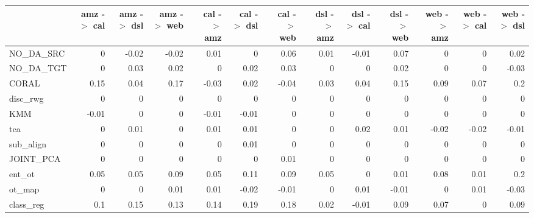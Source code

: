 \begin{tabular}{lrrrrrrrrrrrr}
\hline
           &   amz -\ensuremath{>} cal &   amz -\ensuremath{>} dsl &   amz -\ensuremath{>} web &   cal -\ensuremath{>} amz &   cal -\ensuremath{>} dsl &   cal -\ensuremath{>} web &   dsl -\ensuremath{>} amz &   dsl -\ensuremath{>} cal &   dsl -\ensuremath{>} web &   web -\ensuremath{>} amz &   web -\ensuremath{>} cal &   web -\ensuremath{>} dsl \\
\hline
 NO\_DA\_SRC &         0    &        -0.02 &        -0.02 &         0.01 &         0    &         0.06 &         0.01 &        -0.01 &         0.07 &         0    &         0    &         0.02 \\
 NO\_DA\_TGT &         0    &         0.03 &         0.02 &         0    &         0.02 &         0.03 &         0    &         0    &         0.02 &         0    &         0    &        -0.03 \\
 CORAL     &         0.15 &         0.04 &         0.17 &        -0.03 &         0.02 &        -0.04 &         0.03 &         0.04 &         0.15 &         0.09 &         0.07 &         0.2  \\
 disc\_rwg  &         0    &         0    &         0    &         0    &         0    &         0    &         0    &         0    &         0    &         0    &         0    &         0    \\
 KMM       &        -0.01 &         0    &         0    &        -0.01 &        -0.01 &         0    &         0    &         0    &         0    &         0    &         0    &         0    \\
 tca       &         0    &         0.01 &         0    &         0.01 &         0.01 &         0    &         0    &         0.02 &         0.01 &        -0.02 &        -0.02 &        -0.01 \\
 sub\_align &         0    &         0    &         0    &         0    &         0.01 &         0    &         0    &         0    &         0    &         0    &         0    &         0    \\
 JOINT\_PCA &         0    &         0    &         0    &         0    &         0    &         0.01 &         0    &         0    &         0    &         0    &         0    &         0    \\
 ent\_ot    &         0.05 &         0.05 &         0.09 &         0.05 &         0.11 &         0.09 &         0.05 &         0    &         0.01 &         0.08 &         0.01 &         0.2  \\
 ot\_map    &         0    &         0    &         0.01 &         0.01 &        -0.02 &        -0.01 &         0    &         0.01 &        -0.01 &         0    &         0.01 &        -0.03 \\
 class\_reg &         0.1  &         0.15 &         0.13 &         0.14 &         0.19 &         0.18 &         0.02 &        -0.01 &         0.09 &         0.07 &         0    &         0.09 \\
\hline
\end{tabular}